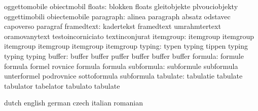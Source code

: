                            oggettomobile             obiectmobil
                   floats: blokken                   floats
                           gleitobjekte              plvouciobjekty
                           oggettimobili             obiectemobile
                paragraph: alinea                    paragraph
                           absatz                    odstavec
                           capoverso                 paragraf
               framedtext: kadertekst                framedtext
                           umrahmtertext             oramovanytext
                           testoincorniciato         textinconjurat
                itemgroup: itemgroup                 itemgroup
                           itemgroup                 itemgroup
                           itemgroup                 itemgroup
                   typing: typen                     typing
                           tippen                    typing
                           typing                    typing %
                   buffer: buffer                    buffer
                           puffer                    buffer
                           buffer                    buffer
                  formula: formule                   formula
                           formel                    rovnice
                           formula                   formula
               subformula: subformule                subformula
                           unterformel               podrovnice
                           sottoformula              subformula
                 tabulate: tabulatie                 tabulate
                           tabulator                 tabelator
                           tabulato                  tabulate

\stopsetupvariables




\startelements             dutch                     english
                           german                    czech
                           italian                   romanian

